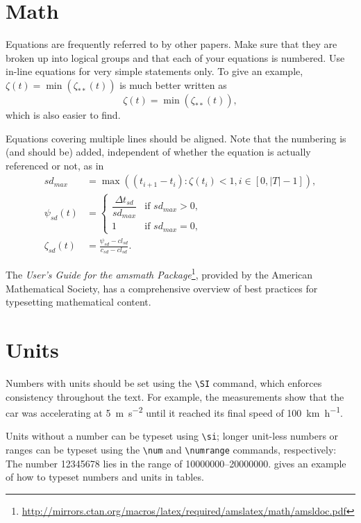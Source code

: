 \documentclass[]{ccs-thesis}
\begin{document}
{\section{Math}

Equations are frequently referred to by other papers.
Make sure that they are broken up into logical groups and that each of your equations is numbered.
Use in-line equations for very simple statements only.
To give an example, $\zeta(t) = \min( \zeta_{**}(t))$ is much better written as
\begin{equation}\label{eq:zeta}
\zeta(t) =
	\min\left(
		\zeta_{**}(t)
	\right)
,
\end{equation}
which is also easier to find.

Equations covering multiple lines should be aligned.
Note that the numbering is (and should be) added, independent of whether the equation is actually referenced or not, as in
\begin{align}
sd_{max} &=
	\max\left(
		(t_{i+1} - t_i)
			: \zeta(t_i) < 1, i \in [0, |T|-1]
	\right)
,\\
\psi_{sd}(t) &=
	\begin{cases}
		\dfrac{\Delta t_{sd}}{sd_{max}}
			& \text{if $sd_{max} > 0$}, \\
		1
			& \text{if $sd_{max} = 0$},
	\end{cases}
\\
\zeta_{sd}(t) &= 
	\frac{
		\psi_{sd} - cl_{sd}
	}{
		c_{sd} - cl_{sd}
	}
.
\end{align}

The \emph{User's Guide for the amsmath Package}\footnote{\url{http://mirrors.ctan.org/macros/latex/required/amslatex/math/amsldoc.pdf}}, provided by the American Mathematical Society, has a comprehensive overview of best practices for typesetting mathematical content.


\clearpage
\section{Units}

Numbers with units should be set using the \verb|\SI| command, which enforces consistency throughout the text.
For example, the measurements show that the car was accelerating at \SI{5}{\metre\per\second\squared} until it reached its final speed of \SI{100}{\kilo\metre\per\hour}.

Units without a number can be typeset using \verb|\si|; longer unit-less numbers or ranges can be typeset using the \verb|\num| and \verb|\numrange| commands, respectively: The number \num{12345678} lies in the range of \numrange{10000000}{20000000}.
 gives an example of how to typeset numbers and units in tables.

}
\end{document}
